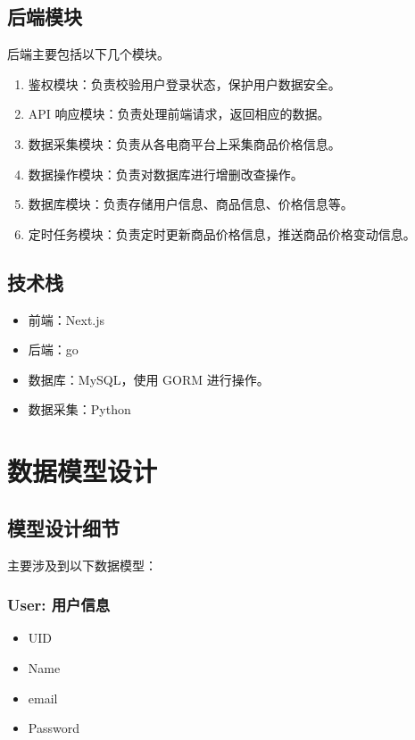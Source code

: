 \subsection{后端模块}

后端主要包括以下几个模块。

\begin{enumerate}
  \item 鉴权模块：负责校验用户登录状态，保护用户数据安全。
  \item API 响应模块：负责处理前端请求，返回相应的数据。
  \item 数据采集模块：负责从各电商平台上采集商品价格信息。
  \item 数据操作模块：负责对数据库进行增删改查操作。
  \item 数据库模块：负责存储用户信息、商品信息、价格信息等。
  \item 定时任务模块：负责定时更新商品价格信息，推送商品价格变动信息。
\end{enumerate}

\subsection{技术栈}

\begin{itemize}
  \item 前端：Next.js
  \item 后端：go
  \item 数据库：MySQL，使用 GORM 进行操作。
  \item 数据采集：Python
\end{itemize}

\section{数据模型设计}

\subsection{模型设计细节}

主要涉及到以下数据模型：

\subsubsection{User: 用户信息}

\begin{itemize}
  \item UID
  \item Name
  \item email
  \item Password
\end{itemize}

